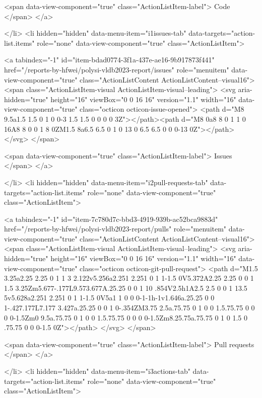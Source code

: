 {{        <span data-view-component="true" class="ActionListItem-label">
          Code
</span>      
</a>
  
</li>
        <li hidden="hidden" data-menu-item="i1issues-tab" data-targets="action-list.items" role="none" data-view-component="true" class="ActionListItem">
    
    
    <a tabindex="-1" id="item-bdad0774-3f1a-437e-ae16-9b917873f441" href="/reports-by-hfwei/polysi-vldb2023-report/issues" role="menuitem" data-view-component="true" class="ActionListContent ActionListContent--visual16">
        <span class="ActionListItem-visual ActionListItem-visual--leading">
          <svg aria-hidden="true" height="16" viewBox="0 0 16 16" version="1.1" width="16" data-view-component="true" class="octicon octicon-issue-opened">
    <path d="M8 9.5a1.5 1.5 0 1 0 0-3 1.5 1.5 0 0 0 0 3Z"></path><path d="M8 0a8 8 0 1 1 0 16A8 8 0 0 1 8 0ZM1.5 8a6.5 6.5 0 1 0 13 0 6.5 6.5 0 0 0-13 0Z"></path>
</svg>
        </span>
      
        <span data-view-component="true" class="ActionListItem-label">
          Issues
</span>      
</a>
  
</li>
        <li hidden="hidden" data-menu-item="i2pull-requests-tab" data-targets="action-list.items" role="none" data-view-component="true" class="ActionListItem">
    
    
    <a tabindex="-1" id="item-7c780d7c-bbd3-4919-939b-ac52bca9883d" href="/reports-by-hfwei/polysi-vldb2023-report/pulls" role="menuitem" data-view-component="true" class="ActionListContent ActionListContent--visual16">
        <span class="ActionListItem-visual ActionListItem-visual--leading">
          <svg aria-hidden="true" height="16" viewBox="0 0 16 16" version="1.1" width="16" data-view-component="true" class="octicon octicon-git-pull-request">
    <path d="M1.5 3.25a2.25 2.25 0 1 1 3 2.122v5.256a2.251 2.251 0 1 1-1.5 0V5.372A2.25 2.25 0 0 1 1.5 3.25Zm5.677-.177L9.573.677A.25.25 0 0 1 10 .854V2.5h1A2.5 2.5 0 0 1 13.5 5v5.628a2.251 2.251 0 1 1-1.5 0V5a1 1 0 0 0-1-1h-1v1.646a.25.25 0 0 1-.427.177L7.177 3.427a.25.25 0 0 1 0-.354ZM3.75 2.5a.75.75 0 1 0 0 1.5.75.75 0 0 0 0-1.5Zm0 9.5a.75.75 0 1 0 0 1.5.75.75 0 0 0 0-1.5Zm8.25.75a.75.75 0 1 0 1.5 0 .75.75 0 0 0-1.5 0Z"></path>
</svg>
        </span>
      
        <span data-view-component="true" class="ActionListItem-label">
          Pull requests
</span>      
</a>
  
</li>
        <li hidden="hidden" data-menu-item="i3actions-tab" data-targets="action-list.items" role="none" data-view-component="true" class="ActionListItem">
    
}}
